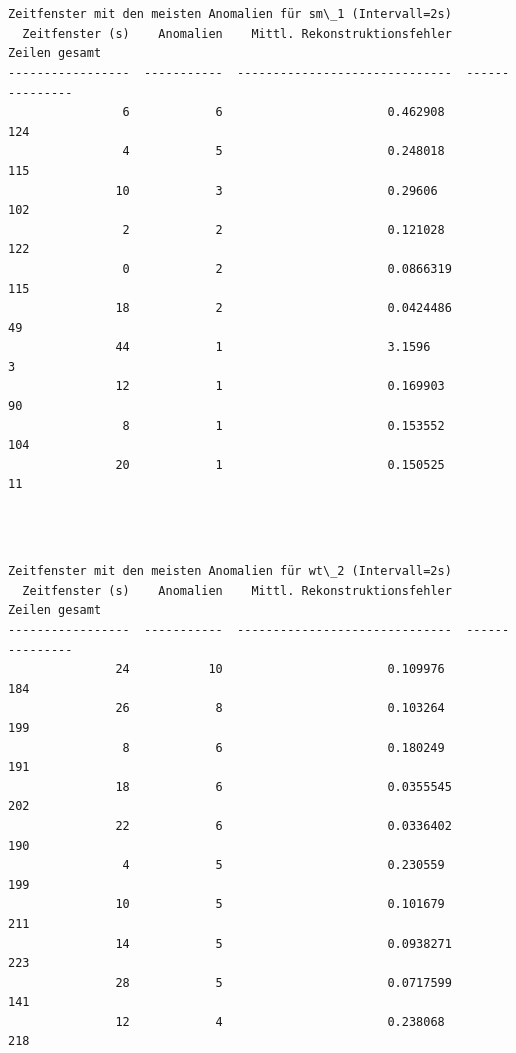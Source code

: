 \documentclass[11pt]{article}
\begin{document}
    \begin{center}
    \end{center}
    { \hspace*{\fill} \\}
    
    \begin{Verbatim}[commandchars=\\\{\}]

Zeitfenster mit den meisten Anomalien für sm\_1 (Intervall=2s)
  Zeitfenster (s)    Anomalien    Mittl. Rekonstruktionsfehler    Zeilen gesamt
-----------------  -----------  ------------------------------  ---------------
                6            6                       0.462908               124
                4            5                       0.248018               115
               10            3                       0.29606                102
                2            2                       0.121028               122
                0            2                       0.0866319              115
               18            2                       0.0424486               49
               44            1                       3.1596                   3
               12            1                       0.169903                90
                8            1                       0.153552               104
               20            1                       0.150525                11
    \end{Verbatim}

    \begin{center}
    \end{center}
    { \hspace*{\fill} \\}
    
    \begin{Verbatim}[commandchars=\\\{\}]

Zeitfenster mit den meisten Anomalien für wt\_2 (Intervall=2s)
  Zeitfenster (s)    Anomalien    Mittl. Rekonstruktionsfehler    Zeilen gesamt
-----------------  -----------  ------------------------------  ---------------
               24           10                       0.109976               184
               26            8                       0.103264               199
                8            6                       0.180249               191
               18            6                       0.0355545              202
               22            6                       0.0336402              190
                4            5                       0.230559               199
               10            5                       0.101679               211
               14            5                       0.0938271              223
               28            5                       0.0717599              141
               12            4                       0.238068               218
    \end{Verbatim}
\end{document}
